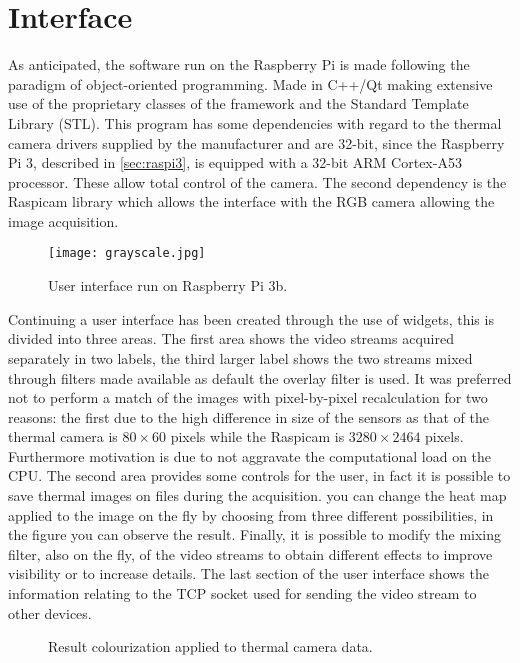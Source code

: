 %
\section{Interface}
\label{sec:raspberry-software}
As anticipated, the software run on the Raspberry Pi is made following the
paradigm of object-oriented programming. Made in C++/Qt making extensive use
of the proprietary classes of the framework and the Standard Template Library
(STL). This program has some dependencies with regard to the thermal camera
drivers supplied by the manufacturer and are 32-bit, since the Raspberry Pi 3,
described in \ref{sec:raspi3}, is equipped with a 32-bit ARM Cortex-A53
processor. These allow total control of the camera. The second dependency is the
Raspicam library which allows the interface with the RGB camera allowing the
image acquisition.
%
\begin{figure}[htb]
	\centering
	\texttt{[image: grayscale.jpg]}
	\caption{User interface run on Raspberry Pi 3b.}
	\label{fig:software-main-ui}
\end{figure}
%
Continuing a user interface has been created through the use of widgets, this is
divided into three areas. The first area shows the video streams acquired
separately in two labels, the third larger label shows the two streams mixed
through filters made available as default the overlay filter is used. It was
preferred not to perform a match of the images with pixel-by-pixel recalculation
for two reasons: the first due to the high difference in size of the sensors as
that of the thermal camera is $80 \times 60$ pixels while the Raspicam is $3280
\times 2464$ pixels. Furthermore motivation is due to not aggravate the 
computational load on the CPU.
The second area provides some controls for the user, in fact it is
possible to save thermal images on files during the acquisition. you can change
the heat map applied to the image on the fly by choosing from three different
possibilities, in the figure you can observe the result. 
Finally, it is possible to modify the mixing filter, also on the fly, of the
video streams to obtain different effects to improve visibility or to increase
details.
The last section of the user interface shows the information relating
to the TCP socket used for sending the video stream to other devices.
%
\begin{figure}[htb]
    \centering
     \quad
     \quad
    \caption{Result colourization applied to thermal camera data.}
    \label{fig:reuslt-maps}
\end{figure}
%
